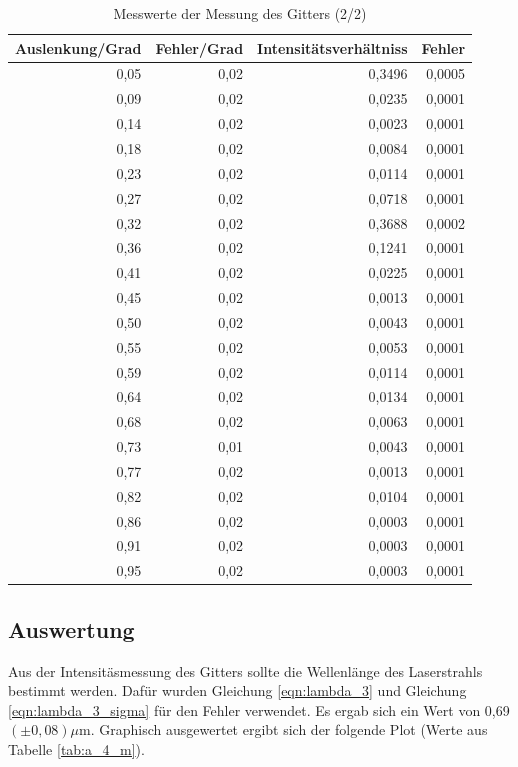 \documentclass[12pt]{scrartcl}
\begin{document}
\begin{table}[H]
\caption{Messwerte der Messung des Gitters (2/2)}
\begin{center}
\begin{tabular}{|r|r|r|r|}
\hline
\multicolumn{1}{|l|}{Auslenkung/Grad} & \multicolumn{1}{l|}{Fehler/Grad} & \multicolumn{1}{l|}{Intensitätsverhältniss} & \multicolumn{1}{l|}{Fehler} \\ \hline
0,05 & 0,02 & 0,3496 & 0,0005 \\ \hline
0,09 & 0,02 & 0,0235 & 0,0001 \\ \hline
0,14 & 0,02 & 0,0023 & 0,0001 \\ \hline
0,18 & 0,02 & 0,0084 & 0,0001 \\ \hline
0,23 & 0,02 & 0,0114 & 0,0001 \\ \hline
0,27 & 0,02 & 0,0718 & 0,0001 \\ \hline
0,32 & 0,02 & 0,3688 & 0,0002 \\ \hline
0,36 & 0,02 & 0,1241 & 0,0001 \\ \hline
0,41 & 0,02 & 0,0225 & 0,0001 \\ \hline
0,45 & 0,02 & 0,0013 & 0,0001 \\ \hline
0,50 & 0,02 & 0,0043 & 0,0001 \\ \hline
0,55 & 0,02 & 0,0053 & 0,0001 \\ \hline
0,59 & 0,02 & 0,0114 & 0,0001 \\ \hline
0,64 & 0,02 & 0,0134 & 0,0001 \\ \hline
0,68 & 0,02 & 0,0063 & 0,0001 \\ \hline
0,73 & 0,01 & 0,0043 & 0,0001 \\ \hline
0,77 & 0,02 & 0,0013 & 0,0001 \\ \hline
0,82 & 0,02 & 0,0104 & 0,0001 \\ \hline
0,86 & 0,02 & 0,0003 & 0,0001 \\ \hline
0,91 & 0,02 & 0,0003 & 0,0001 \\ \hline
0,95 & 0,02 & 0,0003 & 0,0001 \\ \hline
\end{tabular}
\end{center}
\label{tab:a_4_e_b}
\end{table}



\subsection{Auswertung}
Aus der Intensitäsmessung des Gitters sollte die Wellenlänge des Laserstrahls bestimmt werden. Dafür wurden Gleichung \ref{eqn:lambda_3} und Gleichung \ref{eqn:lambda_3_sigma} für den Fehler verwendet. Es ergab sich ein Wert von 0,69 $(\pm  0,08)\mu$m. Graphisch ausgewertet ergibt sich der folgende Plot (Werte aus Tabelle \ref{tab:a_4_m}).
\end{document}
